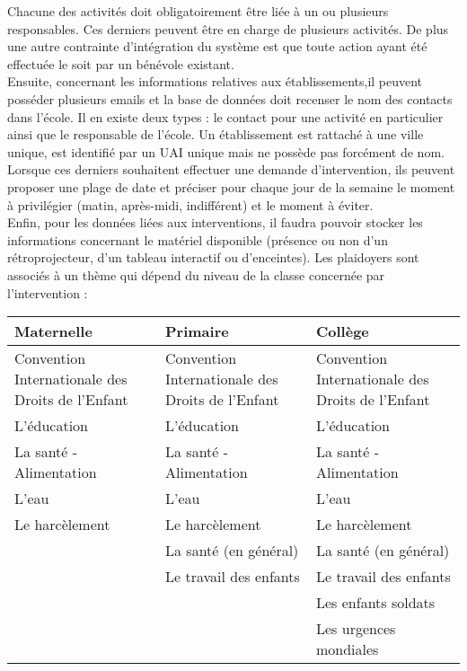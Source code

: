 Chacune des activités doit obligatoirement être liée à un ou plusieurs responsables. Ces derniers peuvent être en charge de plusieurs activités. De plus une autre contrainte d'intégration du système est que toute action ayant été effectuée le soit par un bénévole existant. \\

Ensuite, concernant les informations relatives aux établissements,il peuvent posséder plusieurs emails et la base de données doit recenser le nom des contacts dans l'école. Il en existe deux types : le contact pour une activité en particulier ainsi que le responsable de l'école. Un établissement est rattaché à une ville unique, est identifié par un UAI unique mais ne possède pas forcément de nom. Lorsque ces derniers souhaitent effectuer une demande d'intervention, ils peuvent proposer une plage de date et préciser pour chaque jour de la semaine le moment à privilégier (matin, après-midi, indifférent) et le moment à éviter. \\

Enfin, pour les données liées aux interventions, il faudra pouvoir stocker les informations concernant le matériel disponible (présence ou non d'un rétroprojecteur, d'un tableau interactif ou d'enceintes). Les plaidoyers sont associés à un thème qui dépend du niveau de la classe concernée par l'intervention :

\begin{tabular}{|p{5cm}|p{5cm}|p{5cm}|}
  \hline
  Maternelle & Primaire & Collège \\
  \hline
  Convention Internationale des Droits de l'Enfant & Convention Internationale des Droits de l'Enfant & Convention Internationale des Droits de l'Enfant \\
  \hline
  L'éducation & L'éducation & L'éducation \\
  \hline
  La santé - Alimentation & La santé - Alimentation & La santé - Alimentation \\
  \hline
  L'eau & L'eau & L'eau \\
  \hline
  Le harcèlement & Le harcèlement & Le harcèlement \\
  \hline
  & La santé (en général) & La santé (en général) \\
  \hline
  & Le travail des enfants & Le travail des enfants \\
  \hline
  & & Les enfants soldats \\
  \hline
  & & Les urgences mondiales \\
  \hline
\end{tabular}
